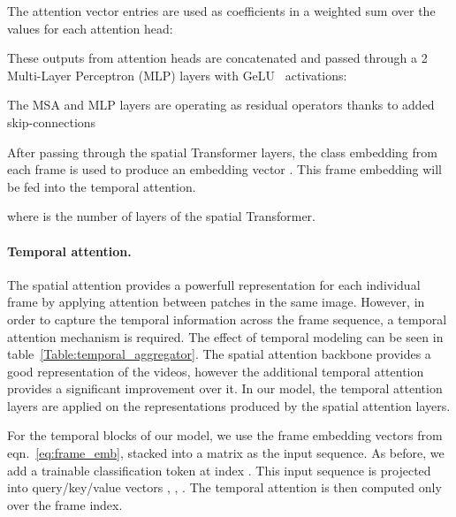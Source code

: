 \documentclass[10pt,twocolumn,letterpaper]{article}
\begin{document}
\vspace{-0.3cm}


The attention vector entries are used as coefficients in a weighted sum over the values for each attention head:

\vspace{-0.3cm}


These outputs from attention heads are concatenated and passed through a 2 Multi-Layer Perceptron (MLP) layers with GeLU~\cite{Hendrycks2016GaussianEL} activations:

\vspace{-0.3cm}

The MSA and MLP layers are operating as residual operators thanks to added skip-connections

After passing through the spatial Transformer layers, the class embedding from each frame is used to produce an embedding vector .  This frame embedding will be fed into the temporal attention.
\vspace{-0.3cm}
 
where  is the number of layers of the spatial Transformer.


\paragraph{Temporal attention.} The spatial attention provides a powerfull representation for each individual frame by applying attention between patches in the same image.  However, in order to capture the temporal information across the frame sequence, a temporal attention mechanism is required.  The effect of temporal modeling can be seen in table~\ref{Table:temporal_aggregator}.  The spatial attention backbone provides a good representation of the videos, however the additional temporal attention provides a significant improvement over it.
In our model, the temporal attention layers are applied on the representations produced by the spatial attention layers. 

For the temporal blocks of our model, we use the frame embedding vectors from eqn.~\ref{eq:frame_emb}, stacked into a matrix  as the input sequence. As before, we add a trainable classification token at index . This input sequence is projected into query/key/value vectors , , . The temporal attention is then computed only over the frame index. 




\vspace{-0.3cm}

\vspace{-0.3cm}
\end{document}
